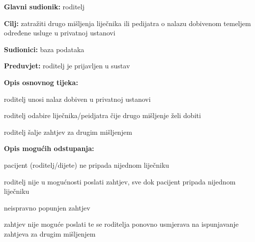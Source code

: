                     \noindent {}
					\begin{packed_item}
						\item \textbf{Glavni sudionik: }roditelj
						\item  \textbf{Cilj:} zatražiti drugo mišljenja liječnika ili pedijatra o nalazu dobivenom temeljem određene usluge u privatnoj ustanovi
						\item  \textbf{Sudionici:} baza podataka
						\item  \textbf{Preduvjet:} roditelj je prijavljen u sustav
						\item  \textbf{Opis osnovnog tijeka:}
						
						\item[] \begin{packed_enum}
	
							\item roditelj unosi nalaz dobiven u privatnoj ustanovi
                            \item roditelj odabire liječnika/peidjatra čije drugo mišljenje želi dobiti
							\item roditelj šalje zahtjev za drugim mišljenjem
						
						\end{packed_enum}
						
						\item  \textbf{Opis mogućih odstupanja:}
						
						\item[] \begin{packed_item}
	
							\item[2.a] pacijent (roditelj/dijete) ne pripada nijednom liječniku
							\item[] \begin{packed_enum}
								\item roditelj nije u mogućnosti poslati zahtjev, sve dok pacijent pripada nijednom liječniku
							\end{packed_enum}

                            \item[3.a] neispravno popunjen zahtjev
                            \item[] \begin{packed_enum}
								\item zahtjev nije moguće poslati te se roditelja ponovno usmjerava na ispunjavanje zahtjeva za drugim mišljenjem
							\end{packed_enum}
						\end{packed_item}
					\end{packed_item}


